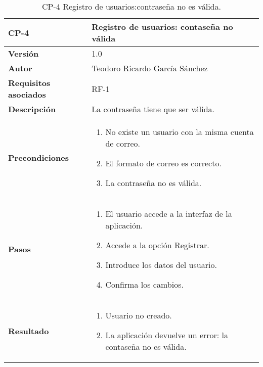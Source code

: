 \begin{table}[p]
	\centering
	\begin{tabularx}{\linewidth}{ p{} p{} }
		\toprule
		\textbf{CP-4}    & \textbf{Registro de usuarios: contaseña no válida}\\
		\toprule
		\textbf{Versión}              & 1.0    \\
		\textbf{Autor}                & Teodoro Ricardo García Sánchez \\
		\textbf{Requisitos asociados} & RF-1 \\
		\textbf{Descripción}          & La contraseña tiene que ser válida.\\
		\textbf{Precondiciones}       &  
		\begin{enumerate}
			\def\labelenumi{\arabic{enumi}.}
			\tightlist
			\item No existe un usuario con la misma cuenta de correo.
			\item El formato de correo es correcto.
			\item La contraseña no es válida.
		\end{enumerate}\\
		\textbf{Pasos}             &
		\begin{enumerate}
			\def\labelenumi{\arabic{enumi}.}
			\tightlist
			\item El usuario accede a la interfaz de la aplicación.
			\item Accede a la opción Registrar.
			\item Introduce los datos del usuario.
			\item Confirma los cambios.
		\end{enumerate}\\
		\textbf{Resultado}          & 
		\begin{enumerate}
			\item Usuario no creado.
			\item La aplicación devuelve un error: la contaseña no es válida.
		\end{enumerate}\\
		\bottomrule
	\end{tabularx}
	\caption{CP-4 Registro de usuarios:contraseña no es válida.}
\end{table}

